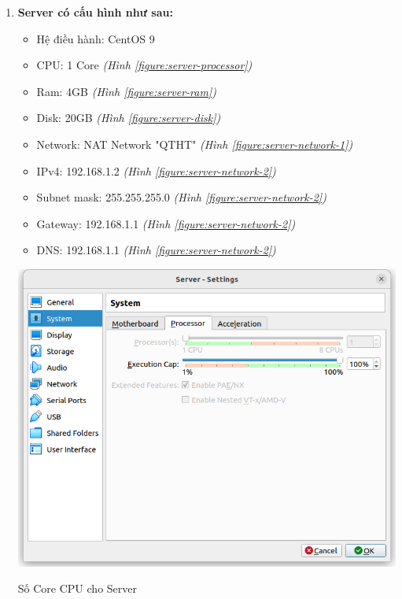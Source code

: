 \documentclass[a4paper, 11pt]{article}
\begin{document}
\begin{enumerate}
    \item \textbf{Server có cấu hình như sau:}
          \begin{itemize}
              \item Hệ điều hành: CentOS 9
              \item CPU: 1 Core \textit{(Hình \ref{figure:server-processor})}
              \item Ram: 4GB \textit{(Hình \ref{figure:server-ram})}
              \item Disk: 20GB \textit{(Hình \ref{figure:server-disk})}
              \item Network: NAT Network "QTHT" \textit{(Hình \ref{figure:server-network-1})}
              \item IPv4: 192.168.1.2 \textit{(Hình \ref{figure:server-network-2})}
              \item Subnet mask: 255.255.255.0 \textit{(Hình \ref{figure:server-network-2})}
              \item Gateway: 192.168.1.1 \textit{(Hình \ref{figure:server-network-2})}
              \item DNS: 192.168.1.1 \textit{(Hình \ref{figure:server-network-2})}
          \end{itemize}

          \begin{minipage}
              {\linewidth}
              \captionsetup{type=figure}
              \centering
              \includegraphics[width=\linewidth]{images/server-processor.png}
              \caption{Số Core CPU cho Server}
              \label{figure:server-processor}
          \end{minipage}


\end{enumerate}
\end{document}

